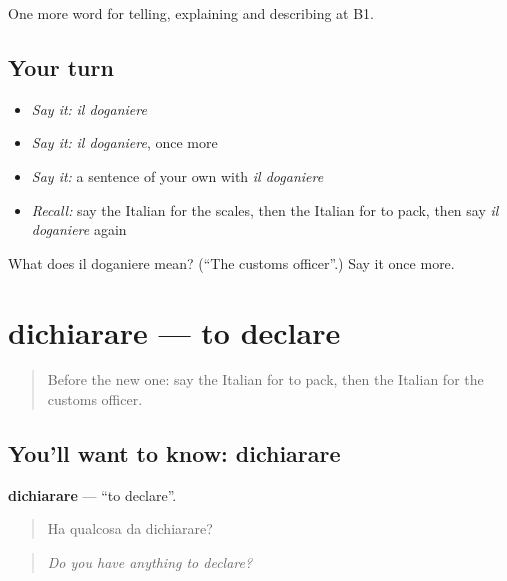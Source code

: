 \begin{grammarlens}[title={What you've built}]
One more word for telling, explaining and describing at B1.
\end{grammarlens}

\subsection*{Your turn}
\begin{itemize}
\raggedright
  \item \emph{Say it:} \emph{il doganiere}
  \item \emph{Say it:} \emph{il doganiere}, once more
  \item \emph{Say it:} a sentence of your own with \emph{il doganiere}
  \item \emph{Recall:} say the Italian for the scales, then the Italian for to pack, then say \emph{il doganiere} again
\end{itemize}

\begin{tcolorbox}[breakable,colback=teal!4,colframe=teal!35!black,title={Before you move on}]
What does il doganiere mean? (\textquotedblleft{}The customs officer\textquotedblright{}.) Say it once more.
\end{tcolorbox}
\section[dichiarare]{dichiarare — to declare}

\label{lesson:IT-C427-dichiarare}



\begin{quote}
Before the new one: say the Italian for to pack, then the Italian for the customs officer.
\end{quote}

\subsection*{You'll want to know: dichiarare}
\textbf{dichiarare} — \textquotedblleft{}to declare\textquotedblright{}.

\begin{quote}
Ha qualcosa da dichiarare?
\end{quote}

\begin{quote}
\emph{Do you have anything to declare?}
\end{quote}

